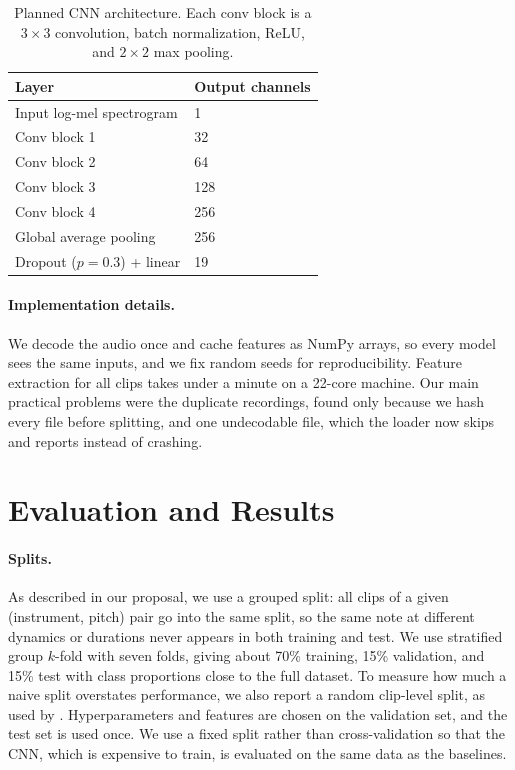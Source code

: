 \documentclass[11pt]{article}
\begin{document}
\begin{table}[t]
  \centering
  \small
  \begin{tabular}{ll}
    \hline
    \textbf{Layer} & \textbf{Output channels} \\
    \hline
    Input log-mel spectrogram & 1 \\
    Conv block 1 & 32 \\
    Conv block 2 & 64 \\
    Conv block 3 & 128 \\
    Conv block 4 & 256 \\
    Global average pooling & 256 \\
    Dropout ($p = 0.3$) + linear & 19 \\
    \hline
  \end{tabular}
  \caption{\label{tab:cnn}
    Planned CNN architecture. Each conv block is a $3 \times 3$ convolution, batch normalization, ReLU, and $2 \times 2$ max pooling.
  }
\end{table}

\paragraph{Implementation details.} We decode the audio once and cache features as NumPy arrays, so every model sees the same inputs, and we fix random seeds for reproducibility. Feature extraction for all clips takes under a minute on a 22-core machine. Our main practical problems were the duplicate recordings, found only because we hash every file before splitting, and one undecodable file, which the loader now skips and reports instead of crashing.

\section{Evaluation and Results}
\label{sec:results}

\paragraph{Splits.} As described in our proposal, we use a grouped split: all clips of a given (instrument, pitch) pair go into the same split, so the same note at different dynamics or durations never appears in both training and test. We use stratified group $k$-fold with seven folds, giving about 70\% training, 15\% validation, and 15\% test with class proportions close to the full dataset. To measure how much a naive split overstates performance, we also report a random clip-level split, as used by \citet{mahanta2021deep}. Hyperparameters and features are chosen on the validation set, and the test set is used once. We use a fixed split rather than cross-validation so that the CNN, which is expensive to train, is evaluated on the same data as the baselines.
\end{document}
